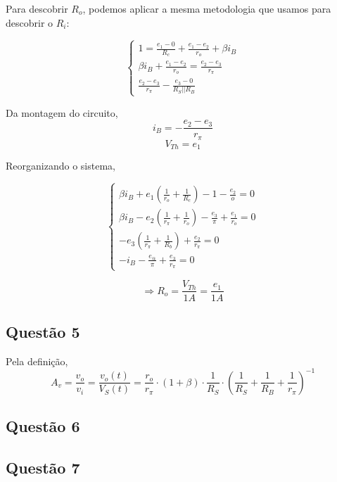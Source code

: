 \documentclass[12pt, a4paper, twoside]{article}
\begin{document}
Para descobrir $R_o$, podemos aplicar a mesma metodologia que usamos para descobrir o $R_i$:

\begin{equation}
    \begin{cases}
        1 = \frac{e_1 - 0}{R_c} + \frac{e_1 - e_2}{r_o} + \beta i_B \\
        \beta i_B + \frac{e_1 - e_2}{r_o} = \frac{e_2 - e_3}{r_\pi} \\
         \frac{e_2 - e_3}{r_\pi} - \frac{e_3 - 0}{R_S || R_B}
    \end{cases}
\end{equation}

Da montagem do circuito,
$$ i_B = -\frac{e_2 - e_3}{r_\pi} $$
$$ V_{Th} = e_1 $$

Reorganizando o sistema,

\begin{equation}
    \begin{cases}
        \beta i_B + e_1 \left(\frac{1}{r_o} + \frac{1}{R_c}\right) - 1 - \frac{e_2}{o} = 0 \\
        \beta i_B - e_2 \left(\frac{1}{r_\pi} + \frac{1}{r_o}\right) - \frac{e_3}{\pi} + \frac{e_1}{r_o} = 0\\
        - e_3 \left(\frac{1}{r_\pi} + \frac{1}{R_b}\right) + \frac{e_2}{r_\pi} = 0 \\
        - i_B - \frac{e_@}{\pi} + \frac{e_3}{r_\pi} = 0
    \end{cases}
\end{equation}

$$ \Rightarrow R_o = \frac{V_{Th}}{1A} = \frac{e_1}{1A} $$

\subsection{Questão 5}

Pela definição,
$$ A_v = \frac{v_o}{v_i} = \frac{v_o(t)}{V_S(t)} = \frac{r_o}{r_\pi} \cdot (1+\beta) \cdot \frac{1}{R_S} \cdot \left(\frac{1}{R_S} + \frac{1}{R_B} + \frac{1}{r_\pi} \right)^{-1} $$

\subsection{Questão 6}


\subsection{Questão 7}
\end{document}
